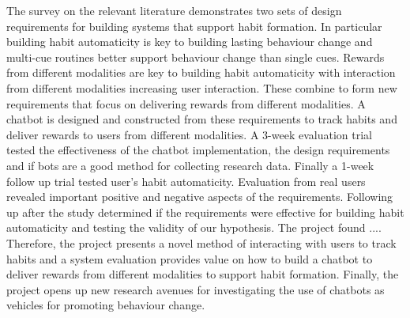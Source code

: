The survey on the relevant literature demonstrates two sets of design requirements for building systems that support habit formation.
In particular building habit automaticity is key to building lasting behaviour change and multi-cue routines better support behaviour change than single cues.
Rewards from different modalities are key to building habit automaticity with interaction from different modalities increasing user interaction.
These combine to form new requirements that focus on delivering rewards from different modalities.\newline
\newline
A chatbot is designed and constructed from these requirements to track habits and deliver rewards to users from different modalities.
A 3-week evaluation trial tested the effectiveness of the chatbot implementation, the design requirements and if bots are a good method for collecting research data.
Finally a 1-week follow up trial tested user's habit automaticity.\newline
\newline
Evaluation from real users revealed important positive and negative aspects of the requirements.
Following up after the study determined if the requirements were effective for building habit automaticity and testing the validity of our hypothesis.\newline
The project found ....\newline
\newline
Therefore, the project presents a novel method of interacting with users to track habits and a system evaluation provides value
on how to build a chatbot to deliver rewards from different modalities to support habit formation.
Finally, the project opens up new research avenues for investigating the use of chatbots as vehicles for promoting behaviour change.
